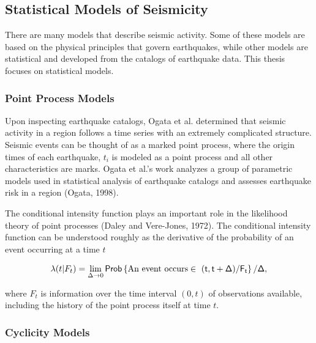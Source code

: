 \documentclass[12pt]{article} %
\theoremstyle{plain}
\begin{document}
	\subsection{Statistical Models of Seismicity}
	
	There are many models that describe seismic activity. Some of these models are based on the physical principles that govern earthquakes, while other models are statistical and developed from the catalogs of earthquake data. This thesis focuses on statistical models.

	
	
	
	\subsubsection{Point Process Models}

	
	Upon inspecting earthquake catalogs, Ogata et al. determined that seismic activity in a region follows a time series with an extremely complicated structure.
	Seismic events can be thought of as a marked point process, where the origin times of each  earthquake, $t_i$ is modeled as a point process and all other characteristics are marks.  Ogata et al.'s work analyzes a group of parametric models used in statistical analysis of earthquake catalogs and assesses earthquake risk in a region (Ogata, 1998).
	
	The conditional intensity function plays an important role in the likelihood theory of point processes (Daley and Vere-Jones, 1972).
	The conditional intensity function can be understood roughly as the derivative of the probability of an event occurring at a time $t$
	
	\begin{equation} \label{eq:cond}
		\lambda(t | F_t) = \lim\limits_{\Delta \rightarrow 0} \sf Prob \left\lbrace \text{An event occurs}\in \ (t,t+ \Delta) / F_t \right\rbrace / \Delta ,
	\end{equation}
	
	\noindent where $F_t$ is information over the time interval $(0,t)$ of observations available, including the history of the point process itself at time $t$. 
	
	
	\subsubsection{Cyclicity Models}
	
\end{document}
